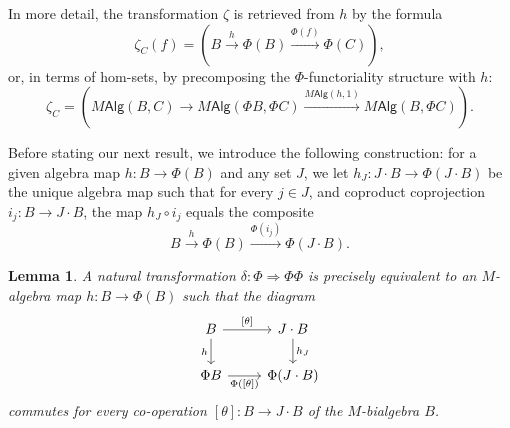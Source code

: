 \documentclass[12pt,reqno]{amsart}
\theoremstyle{plain}
\newtheorem{lem}[thm]{Lemma}
\theoremstyle{definition}
\theoremstyle{remark}
\newcommand{\maps}{\colon}
\newcommand{\To}{\Rightarrow}
\newcommand{\namedcat}[1]{\mathsf{#1}}
\newcommand{\Alg}{\namedcat{Alg}}
\numberwithin{thm}{section}
\begin{document}
In more detail, the transformation $\zeta$ is retrieved from $h$ by the formula 
\[
    \zeta_C(f) = (B \xrightarrow{\;h\;} \Phi(B) \xrightarrow{\Phi(f)} \Phi(C)),
\]
or, in terms of hom-sets, by precomposing the $\Phi$-functoriality structure with $h$: 
\[
    \zeta_C = (M\Alg(B, C) \to M\Alg(\Phi B, \Phi C) \xrightarrow{M\Alg(h, 1)} M\Alg(B, \Phi C)). 
\]

Before stating our next result, we introduce the following construction: for a given algebra map $h \maps B \to \Phi(B)$ and any set $J$, we let $h_J \maps J \cdot B \to \Phi(J \cdot B)$ be the unique algebra map such that for every $j \in J$, and coproduct coprojection $i_j \maps B \to J \cdot B$, the map $h_J \circ i_j$ equals the composite 
\[ 
    B \xrightarrow{h} \Phi(B) \xrightarrow{\Phi(i_j)} \Phi(J \cdot B).
\]

\begin{lem}
\label{lem:M-plethory_square}
    A natural transformation $\delta \maps \Phi \To \Phi\Phi$ is precisely equivalent to an $M$-algebra map $h \maps B \to \Phi(B)$ such that the diagram 
    \[
    \begin{tikzcd}
        B 
        \arrow[r, "{[\theta]}"] 
        \arrow[d, "h", swap] 
        & 
        J \cdot B \arrow[d, "h_J"] 
        \\
        \Phi B 
        \arrow[r, "{\Phi([\theta])}", swap] 
        & 
        \Phi(J \cdot B)
    \end{tikzcd}
    \]
    commutes for every co-operation $[\theta] \maps B \to J \cdot B$ of the $M$-bialgebra $B$. 
\end{lem}
\end{document}
